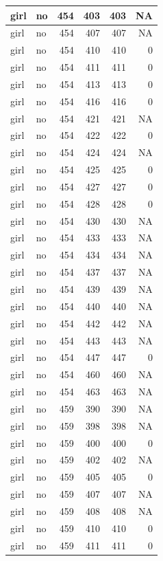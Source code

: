 \documentclass[man]{apa6}
\begin{document}
\begin{tabular}{l|l|r|r|r|r}
\hline
girl & no & 454 & 403 & 403 & NA\\
\hline
girl & no & 454 & 407 & 407 & NA\\
\hline
girl & no & 454 & 410 & 410 & 0\\
\hline
girl & no & 454 & 411 & 411 & 0\\
\hline
girl & no & 454 & 413 & 413 & 0\\
\hline
girl & no & 454 & 416 & 416 & 0\\
\hline
girl & no & 454 & 421 & 421 & NA\\
\hline
girl & no & 454 & 422 & 422 & 0\\
\hline
girl & no & 454 & 424 & 424 & NA\\
\hline
girl & no & 454 & 425 & 425 & 0\\
\hline
girl & no & 454 & 427 & 427 & 0\\
\hline
girl & no & 454 & 428 & 428 & 0\\
\hline
girl & no & 454 & 430 & 430 & NA\\
\hline
girl & no & 454 & 433 & 433 & NA\\
\hline
girl & no & 454 & 434 & 434 & NA\\
\hline
girl & no & 454 & 437 & 437 & NA\\
\hline
girl & no & 454 & 439 & 439 & NA\\
\hline
girl & no & 454 & 440 & 440 & NA\\
\hline
girl & no & 454 & 442 & 442 & NA\\
\hline
girl & no & 454 & 443 & 443 & NA\\
\hline
girl & no & 454 & 447 & 447 & 0\\
\hline
girl & no & 454 & 460 & 460 & NA\\
\hline
girl & no & 454 & 463 & 463 & NA\\
\hline
girl & no & 459 & 390 & 390 & NA\\
\hline
girl & no & 459 & 398 & 398 & NA\\
\hline
girl & no & 459 & 400 & 400 & 0\\
\hline
girl & no & 459 & 402 & 402 & NA\\
\hline
girl & no & 459 & 405 & 405 & 0\\
\hline
girl & no & 459 & 407 & 407 & NA\\
\hline
girl & no & 459 & 408 & 408 & NA\\
\hline
girl & no & 459 & 410 & 410 & 0\\
\hline
girl & no & 459 & 411 & 411 & 0\\

\end{tabular}
\end{document}
